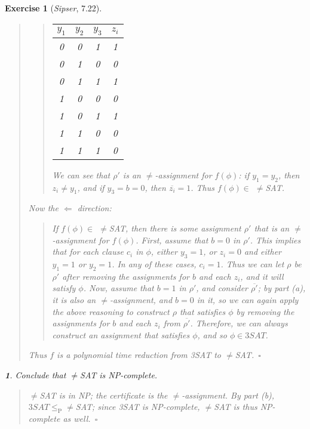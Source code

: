\documentclass{article}
\theoremstyle{break}			%
\newtheorem{exercise}{Exercise}
\theoremstyle{plain}
\newtheorem{subexercise}{}[exercise]
\newenvironment{answer}{\begin{quotation}\noindent}{\end{quotation}}
\newcommand{\sipser}{\textit{Sipser}}
\renewcommand{\qed}{~\ensuremath{\square}}
\newcommand{\setname}[1]{\textit{#1}}
\begin{document}
\begin{exercise}[\sipser, 7.22]
\begin{answer}
\begin{quotation}
\begin{center}
\begin{tabular}{ccc|c}
$y_1$	&$y_2$	&$y_3$	&$z_i$ \\
\hline \hline
0&0&1	&1 \\
0&1&0	&0 \\
0&1&1	&1 \\
1&0&0	&0 \\
1&0&1	&1 \\
1&1&0	&0 \\
1&1&1	&0 \\
\end{tabular}
\end{center}

\noindent We can see that $\rho'$ is an $\not=$-assignment for
$f(\phi)$: if $y_1=y_2$, then $z_i\not=y_1$, and if $y_3=b=0$, then
$\overline{z_i}=1$.  Thus $f(\phi)\in$ $\not=$\setname{SAT}.
\end{quotation}

\noindent Now the $\Longleftarrow$ direction:

\begin{quotation}
\noindent If $f(\phi)\in$ $\not=$\setname{SAT}, then there is some
assignment $\rho'$ that is an $\not=$-assignment for $f(\phi)$.
First, assume that $b=0$ in $\rho'$.  This implies that for each
clause $c_i$ in $\phi$, either $y_3=1$, or $z_i=0$ and either $y_1=1$
or $y_2=1$.  In any of these cases, $c_i=1$.  Thus we can let $\rho$
be $\rho'$ after removing the assignments for $b$ and each $z_i$, and
it will satisfy $\phi$.  Now, assume that $b=1$ in $\rho'$, and
consider $\overline{\rho'}$; by part (a), it is also an
$\not=$-assignment, and $b=0$ in it, so we can again apply the above
reasoning to construct $\rho$ that satisfies $\phi$ by removing the
assignments for $b$ and each $z_i$ from $\overline{\rho'}$.
Therefore, we can always construct an assignment that satisfies
$\phi$, and so $\phi\in\setname{3SAT}$.
\end{quotation}

\noindent Thus $f$ is a polynomial time reduction from \setname{3SAT} to
$\not=$\setname{SAT}.\qed
\end{answer}

\begin{subexercise}
Conclude that $\not=$\setname{SAT} is NP-complete.
\end{subexercise}
\begin{answer}
$\not=$\setname{SAT} is in NP; the certificate is the $\not=$-assignment.
By part (b), $\setname{3SAT}\leq_{\text{P}}\not=$\setname{SAT};
since \setname{3SAT} is NP-complete, $\not=$\setname{SAT} is thus
NP-complete as well.\qed
\end{answer}
\end{exercise}
\end{document}
